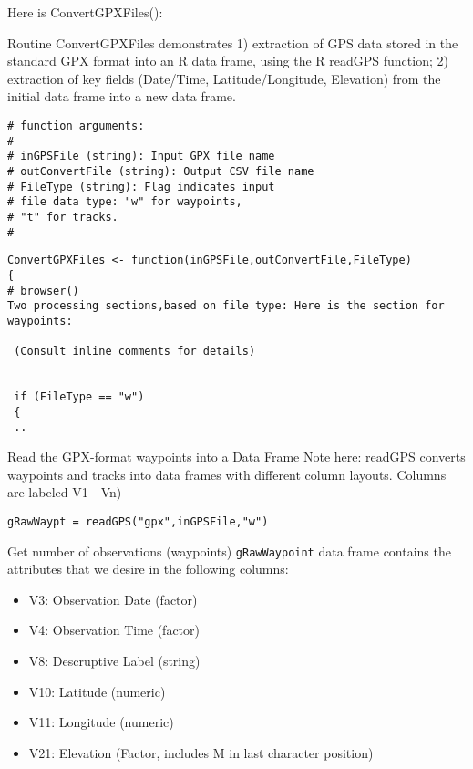 \documentclass{beamer}
\begin{document}
\begin{frame}[fragile]
Here is ConvertGPXFiles():


Routine ConvertGPXFiles demonstrates 1) extraction of GPS data 
stored in the standard GPX format into an R data frame,
using the R readGPS function; 2) extraction of key fields
(Date/Time, Latitude/Longitude, Elevation) from the initial 
data frame into a new data frame.
\end{frame}

\begin{frame}[fragile]
\begin{verbatim}
# function arguments: 
# 
# inGPSFile (string): Input GPX file name
# outConvertFile (string): Output CSV file name
# FileType (string): Flag indicates input
# file data type: "w" for waypoints,
# "t" for tracks.
#
\end{verbatim}
\end{frame}

\begin{frame}[fragile]
\begin{verbatim}
ConvertGPXFiles <- function(inGPSFile,outConvertFile,FileType) 
{
# browser()
Two processing sections,based on file type: Here is the section for waypoints:

 (Consult inline comments for details)


 if (FileType == "w")
 { 
 ..
\end{verbatim} 
 
\end{frame}
\begin{frame}[fragile]

Read the GPX-format waypoints into a Data Frame
Note here: readGPS converts waypoints and tracks into 
data frames with different column layouts. 
Columns are labeled V1 - Vn)

\begin{verbatim}
gRawWaypt = readGPS("gpx",inGPSFile,"w")
\end{verbatim}
\end{frame}

\begin{frame}[fragile]

Get number of observations (waypoints)
\texttt{gRawWaypoint} data frame contains the attributes that we desire in the following columns:
\begin{itemize}
\item V3: Observation Date (factor)
\item V4: Observation Time (factor)
\item V8: Descruptive Label (string)
\item V10: Latitude (numeric)
\item V11: Longitude (numeric)
\item V21: Elevation (Factor, includes M in last character position)
\end{itemize}

\end{frame}
\end{document}
